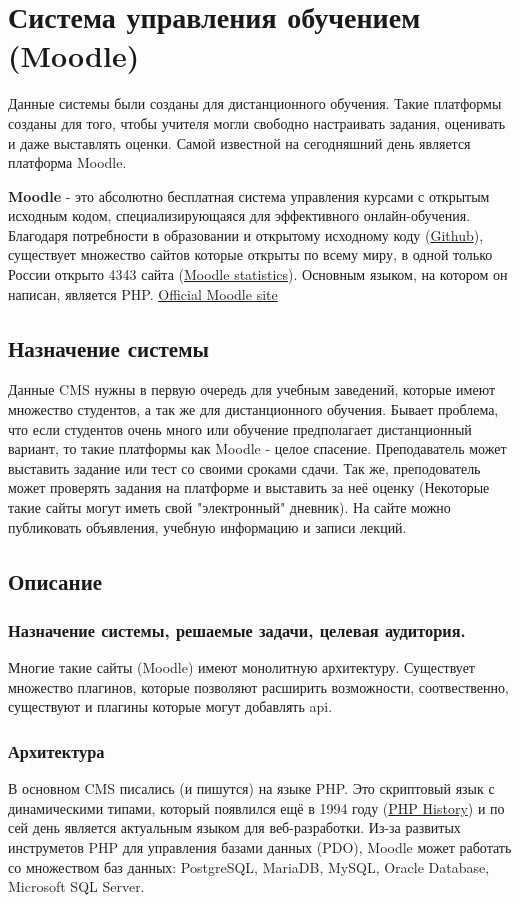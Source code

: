 \documentclass[a4paper, 14pt]{extarticle}
\begin{document}
  \section{Система управления обучением (Moodle)}
Данные системы были созданы для дистанционного обучения. Такие платформы созданы для того, чтобы учителя могли свободно настраивать задания, оценивать и даже выставлять оценки. Самой известной на сегодняшний день является платформа Moodle. \par
{\bfseries{Moodle}} - это абсолютно бесплатная система управления курсами с открытым исходным кодом, специализирующаяся для эффективного онлайн-обучения.
Благодаря потребности в образовании и открытому исходному коду (\href{https://github.com/moodle/moodle}{Github}), существует множество сайтов которые открыты по всему миру, в одной только России открыто 4343 сайта (\href{https://stats.moodle.org}{Moodle statistics}). Основным языком, на котором он написан, является PHP. 
\href{https://moodle.org}{Official Moodle site}
\subsection{Назначение системы}
Данные CMS нужны в первую очередь для учебным заведений, которые имеют множество студентов, а так же для дистанционного обучения. Бывает проблема, что если студентов очень много или обучение предполагает дистанционный вариант, то такие платформы как Moodle - целое спасение. Преподаватель может выставить задание или тест со своими сроками сдачи. Так же, преподователь может проверять задания на платформе и выставить за неё оценку (Некоторые такие сайты могут иметь свой "электронный" дневник). На сайте можно публиковать объявления, учебную информацию и записи лекций.
\subsection{Описание}
\subsubsection{Назначение системы, решаемые задачи, целевая аудитория.}
Многие такие сайты (Moodle) имеют монолитную архитектуру. Существует множество плагинов, которые позволяют расширить возможности, соотвественно, существуют и плагины которые могут добавлять api.
\subsubsection{Архитектура}
В основном CMS писались (и пишутся) на языке PHP. Это скриптовый язык с динамическими типами, который появлился ещё в 1994 году (\href{https://www.php.net/manual/en/history.php.php}{PHP History}) и по сей день является актуальным языком для веб-разработки. Из-за развитых инструметов PHP для управления базами данных (PDO), Moodle может работать со множеством баз данных: PostgreSQL, MariaDB, MySQL, Oracle Database, Microsoft SQL Server.
\end{document}
